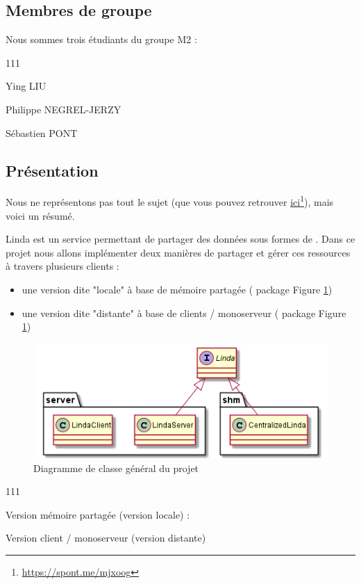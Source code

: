 \subsection{Membres de groupe}

Nous sommes trois étudiants du groupe M2 :
\begin{dinglist}{111}
    \item Ying LIU
    \item Philippe NEGREL-JERZY
    \item Sébastien PONT
\end{dinglist}

\subsection{Présentation}

Nous ne représentons pas tout le sujet (que vous pouvez retrouver \href{https://spont.me/mjxoog}{ici}\footnote{\href{https://spont.me/mjxoog}{https://spont.me/mjxoog}}), mais voici un résumé.

Linda est un service permettant de partager des données sous formes de .
Dans ce projet nous allons implémenter deux manières de partager et gérer ces ressources à travers plusieurs clients :

\begin{itemize}
    \item une version dite "locale" à base de mémoire partagée ( package Figure \ref{fig:main_class_diagram})
    \item une version dite "distante" à base de clients / monoserveur ( package Figure \ref{fig:main_class_diagram})
\end{itemize}

\begin{figure}[H]
    \centering
    \includegraphics[scale=0.7]{src/part-01/mainCD.png}
    \caption{Diagramme de classe général du projet} \label{fig:main_class_diagram}
\end{figure}

\begin{dinglist}{111}
    \item Version mémoire partagée (version locale) :
    \item
    \item Version client / monoserveur (version distante)
\end{dinglist}